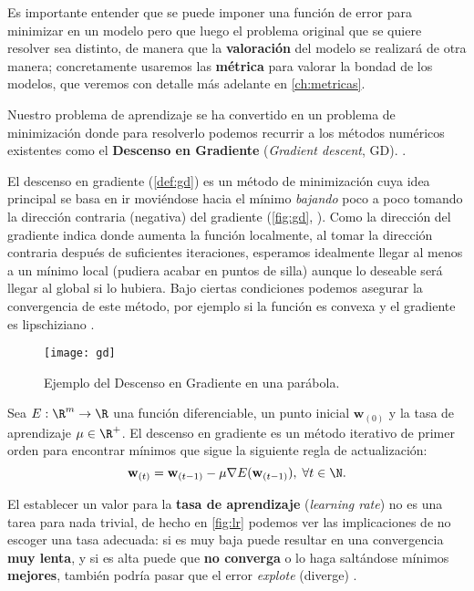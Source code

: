 Es importante entender que se puede imponer una función de error para minimizar en un modelo pero que luego el problema original que se quiere resolver sea distinto, de manera que la \textbf{valoración} del modelo se realizará de otra manera; concretamente usaremos las \textbf{métrica} para valorar la bondad de los modelos, que veremos con detalle más adelante en \autoref{ch:metricas}.

Nuestro problema de aprendizaje se ha convertido en un problema de minimización donde para resolverlo podemos recurrir a los métodos numéricos existentes como el \textbf{Descenso en Gradiente} (\emph{Gradient descent}, GD). \cite{curry1944method}.

El descenso en gradiente (\autoref{def:gd}) es un método de minimización cuya idea principal se basa en ir moviéndose hacia el mínimo \emph{bajando} poco a poco tomando la dirección contraria (negativa) del gradiente (\autoref{fig:gd}, \cite{molala2019sd}). Como la dirección del gradiente indica donde aumenta la función localmente, al tomar la dirección contraria después de suficientes iteraciones, esperamos idealmente llegar al menos a un mínimo local (pudiera acabar en puntos de silla) aunque lo deseable será llegar al global si lo hubiera. Bajo ciertas condiciones podemos asegurar la convergencia de este método, por ejemplo si la función es convexa y el gradiente es lipschiziano \cite{shalev2014understanding}.

\begin{figure}[htpb]
  \centering
  \texttt{[image: gd]}
  \caption{Ejemplo del Descenso en Gradiente en una parábola.}
  \label{fig:gd}
\end{figure}

\begin{definicion}
  Sea $E : \R^m \to \R$ una función diferenciable, un punto inicial $\textbf{w}_{(0)}$ y la tasa de aprendizaje $\mu \in \R^+$. El descenso en gradiente es un método iterativo de primer orden para encontrar mínimos que sigue la siguiente regla de actualización:
  $$\textbf{w}_{(t)} = \textbf{w}_{(t-1)} - \mu \nabla E(\textbf{w}_{(t-1)}), \; \forall t \in \N.$$
  \label{def:gd}
\end{definicion}

El establecer un valor para la \textbf{tasa de aprendizaje} (\emph{learning rate}) no es una tarea para nada trivial, de hecho en \autoref{fig:lr} podemos ver las implicaciones de no escoger una tasa adecuada: si es muy baja puede resultar en una convergencia \textbf{muy lenta}, y si es alta puede que \textbf{no converga} o lo haga saltándose mínimos \textbf{mejores}, también podría pasar que el error \emph{explote} (diverge) \cite{ruder2016overview}.

